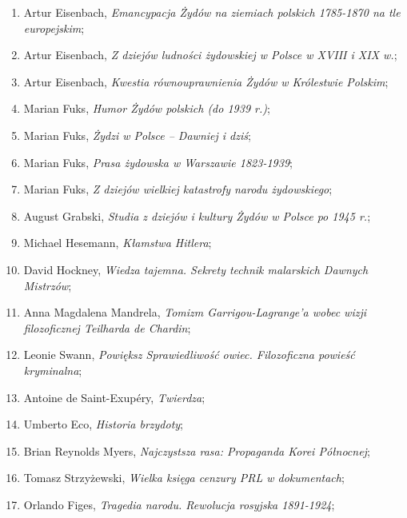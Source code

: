 \documentclass[a4paper,11pt]{article}
\begin{document}
\begin{enumerate}
\item Artur Eisenbach, \textit{Emancypacja Żydów na ziemiach polskich
    1785-1870 na tle europejskim};

\item Artur Eisenbach, \textit{Z dziejów ludności żydowskiej w Polsce w
    XVIII i XIX w.};

\item Artur Eisenbach, \textit{Kwestia równouprawnienia Żydów w
    Królestwie Polskim};

\item Marian Fuks, \textit{Humor Żydów polskich (do 1939 r.)};

\item Marian Fuks, \textit{Żydzi w Polsce – Dawniej i dziś};

\item Marian Fuks, \textit{Prasa żydowska w Warszawie 1823-1939};

\item Marian Fuks, \textit{Z dziejów wielkiej katastrofy narodu
    żydowskiego};

\item August Grabski, \textit{Studia z dziejów i kultury Żydów w Polsce
    po 1945 r.};

\item Michael Hesemann, \textit{Kłamstwa Hitlera};

\item David Hockney, \textit{Wiedza tajemna. Sekrety technik malarskich
    Dawnych Mistrzów};

\item Anna Magdalena Mandrela, \textit{Tomizm Garrigou-Lagrange’a wobec
    wizji filozoficznej Teilharda de Chardin};

\item Leonie Swann, \textit{Powiększ Sprawiedliwość owiec. Filozoficzna
    powieść kryminalna};

\item Antoine de Saint-Exupéry, \textit{Twierdza};

\item Umberto Eco, \textit{Historia brzydoty};

\item Brian Reynolds Myers, \textit{Najczystsza rasa: Propaganda Korei
    Północnej};

\item Tomasz Strzyżewski, \textit{Wielka księga cenzury PRL w
    dokumentach};

\item Orlando Figes, \textit{Tragedia narodu. Rewolucja rosyjska
    1891-1924};


\end{enumerate}
\end{document}
